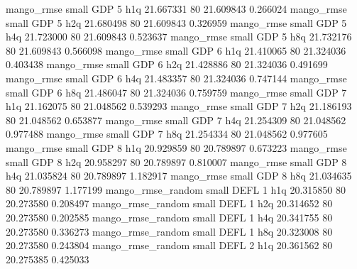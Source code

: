        mango_rmse      small      GDP                 5                  h1q 21.667331 80      21.609843           0.266024
       mango_rmse      small      GDP                 5                  h2q 21.680498 80      21.609843           0.326959
       mango_rmse      small      GDP                 5                  h4q 21.723000 80      21.609843           0.523637
       mango_rmse      small      GDP                 5                  h8q 21.732176 80      21.609843           0.566098
       mango_rmse      small      GDP                 6                  h1q 21.410065 80      21.324036           0.403438
       mango_rmse      small      GDP                 6                  h2q 21.428886 80      21.324036           0.491699
       mango_rmse      small      GDP                 6                  h4q 21.483357 80      21.324036           0.747144
       mango_rmse      small      GDP                 6                  h8q 21.486047 80      21.324036           0.759759
       mango_rmse      small      GDP                 7                  h1q 21.162075 80      21.048562           0.539293
       mango_rmse      small      GDP                 7                  h2q 21.186193 80      21.048562           0.653877
       mango_rmse      small      GDP                 7                  h4q 21.254309 80      21.048562           0.977488
       mango_rmse      small      GDP                 7                  h8q 21.254334 80      21.048562           0.977605
       mango_rmse      small      GDP                 8                  h1q 20.929859 80      20.789897           0.673223
       mango_rmse      small      GDP                 8                  h2q 20.958297 80      20.789897           0.810007
       mango_rmse      small      GDP                 8                  h4q 21.035824 80      20.789897           1.182917
       mango_rmse      small      GDP                 8                  h8q 21.034635 80      20.789897           1.177199
mango_rmse_random      small     DEFL                 1                  h1q 20.315850 80      20.273580           0.208497
mango_rmse_random      small     DEFL                 1                  h2q 20.314652 80      20.273580           0.202585
mango_rmse_random      small     DEFL                 1                  h4q 20.341755 80      20.273580           0.336273
mango_rmse_random      small     DEFL                 1                  h8q 20.323008 80      20.273580           0.243804
mango_rmse_random      small     DEFL                 2                  h1q 20.361562 80      20.275385           0.425033
